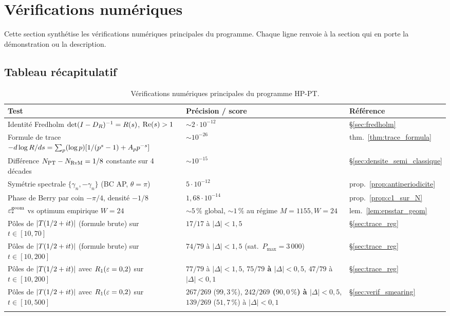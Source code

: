 \section{Vérifications numériques}
\label{sec:verifications_numeriques}

Cette section synthétise les vérifications numériques principales du
programme. Chaque ligne renvoie à la section qui en porte la
démonstration ou la description.

\subsection{Tableau récapitulatif}
\label{sec:verif_table}

\begin{longtable}{@{}p{6.5cm}p{4.5cm}p{3cm}@{}}
\toprule
\textbf{Test} & \textbf{Précision / score} & \textbf{Référence}\\
\midrule
\endhead
Identité Fredholm $\det(I - D_R)^{-1} = R(s)$, $\operatorname{Re}(s) > 1$
 & $\sim 2 \cdot 10^{-12}$ & \S\ref{sec:fredholm}\\
Formule de trace $-d\log R/ds = \sum_p (\log p)[1/(p^s-1) + A_p p^{-s}]$
 & $\sim 10^{-26}$ & thm.~\ref{thm:trace_formula}\\
Différence $N_{\mathrm{PT}} - N_{\mathrm{RvM}} = 1/8$ constante sur 4 décades
 & $\sim 10^{-15}$ & \S\ref{sec:densite_semi_classique}\\
Symétrie spectrale $\{\gamma_n, -\gamma_n\}$ (BC AP, $\theta = \pi$)
 & $5 \cdot 10^{-12}$ & prop.~\ref{prop:antiperiodicite}\\
Phase de Berry par coin $-\pi/4$, densité $-1/8$
 & $1{,}68 \cdot 10^{-14}$ & prop.~\ref{prop:c1_sur_N}\\
$\varepsilon_{*}^{\mathrm{geom}}$ vs optimum empirique $W = 24$
 & $\sim 5\,\%$ global, $\sim 1\,\%$ au régime $M = 1155, W = 24$
 & lem.~\ref{lem:epsstar_geom}\\
Pôles de $|T(1/2 + it)|$ (formule brute) sur $t \in [10, 70]$
 & $17/17$ à $|\Delta| < 1{,}5$
 & \S\ref{sec:trace_reg}\\
Pôles de $|T(1/2 + it)|$ (formule brute) sur $t \in [10, 200]$
 & $74/79$ à $|\Delta| < 1{,}5$ (sat.~$P_{\max} = 3\,000$)
 & \S\ref{sec:trace_reg}\\
Pôles de $|T(1/2 + it)|$ avec $R_1(\varepsilon = 0{,}2)$ sur $t \in [10, 200]$
 & $77/79$ à $|\Delta| < 1{,}5$, \textbf{$75/79$ à $|\Delta| < 0{,}5$}, $47/79$ à $|\Delta| < 0{,}1$
 & \S\ref{sec:trace_reg}\\
Pôles de $|T(1/2 + it)|$ avec $R_1(\varepsilon = 0{,}2)$ sur $t \in [10, 500]$
 & $267/269$ ($99{,}3\,\%$), \textbf{$242/269$ ($90{,}0\,\%$) à $|\Delta| < 0{,}5$}, $139/269$ ($51{,}7\,\%$) à $|\Delta| < 0{,}1$
 & \S\ref{sec:verif_smearing}\\
\bottomrule
\caption{Vérifications numériques principales du programme HP-PT.}
\label{tab:verifs_numeriques}
\end{longtable}

